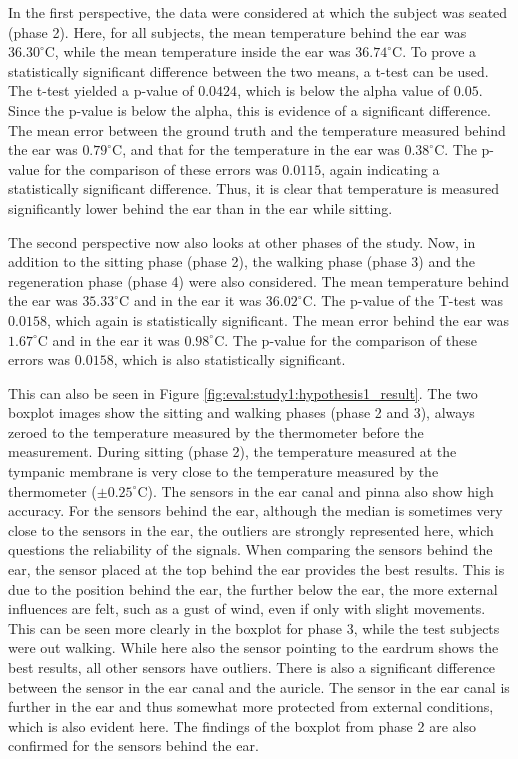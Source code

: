In the first perspective, the data were considered at which the subject was seated (phase 2). 
Here, for all subjects, the mean temperature behind the ear was \(36.30^\circ\text{C}\), while the mean temperature inside the ear was \(36.74^\circ\text{C}\). 
To prove a statistically significant difference between the two means, a t-test can be used.
The t-test yielded a p-value of \(0.0424\), which is below the alpha value of \(0.05\).
Since the p-value is below the alpha, this is evidence of a significant difference.
The mean error between the ground truth and the temperature measured behind the ear was \(0.79^\circ\text{C}\), and that for the temperature in the ear was \(0.38^\circ\text{C}\). 
The p-value for the comparison of these errors was \(0.0115\), again indicating a statistically significant difference.
Thus, it is clear that temperature is measured significantly lower behind the ear than in the ear while sitting.

The second perspective now also looks at other phases of the study. 
Now, in addition to the sitting phase (phase 2), the walking phase (phase 3) and the regeneration phase (phase 4) were also considered. 
The mean temperature behind the ear was \(35.33^\circ\text{C}\) and in the ear it was \(36.02^\circ\text{C}\). 
The p-value of the T-test was \(0.0158\), which again is statistically significant.
The mean error behind the ear was \(1.67^\circ\text{C}\) and in the ear it was \(0.98^\circ\text{C}\). 
The p-value for the comparison of these errors was \(0.0158\), which is also statistically significant.

This can also be seen in Figure \ref{fig:eval:study1:hypothesis1_result}.
The two boxplot images show the sitting and walking phases (phase 2 and 3), always zeroed to the temperature measured by the thermometer before the measurement.
During sitting (phase 2), the temperature measured at the tympanic membrane is very close to the temperature measured by the thermometer ($\pm0.25^\circ\text{C}$). 
The sensors in the ear canal and pinna also show high accuracy. 
For the sensors behind the ear, although the median is sometimes very close to the sensors in the ear, the outliers are strongly represented here, which questions the reliability of the signals.
When comparing the sensors behind the ear, the sensor placed at the top behind the ear provides the best results. 
This is due to the position behind the ear, the further below the ear, the more external influences are felt, such as a gust of wind, even if only with slight movements.
This can be seen more clearly in the boxplot for phase 3, while the test subjects were out walking. 
While here also the sensor pointing to the eardrum shows the best results, all other sensors have outliers.
There is also a significant difference between the sensor in the ear canal and the auricle. 
The sensor in the ear canal is further in the ear and thus somewhat more protected from external conditions, which is also evident here. 
The findings of the boxplot from phase 2 are also confirmed for the sensors behind the ear.

